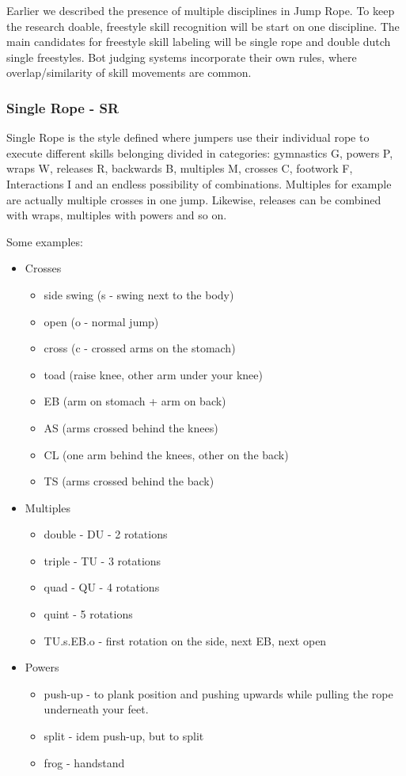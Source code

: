 Earlier we described the presence of multiple disciplines in Jump Rope. To keep the research doable, freestyle skill recognition will be start on one discipline. The main candidates for freestyle skill labeling will be single rope and double dutch single freestyles. Bot judging systems incorporate their own rules, where overlap/similarity of skill movements are common. 

\subsubsection{Single Rope - SR}

Single Rope is the style defined where jumpers use their individual rope to execute different skills belonging divided in categories: gymnastics G, powers P, wraps W, releases R, backwards B, multiples M, crosses C, footwork F, Interactions I and an endless possibility of combinations. Multiples for example are actually multiple crosses in one jump. Likewise, releases can be combined with wraps, multiples with powers and so on.

Some examples:

\begin{itemize}
    \item Crosses
    \begin{itemize}
        \item side swing (s - swing next to the body)
        \item open (o - normal jump)
        \item cross (c - crossed arms on the stomach)
        \item toad (raise knee, other arm under your knee)
        \item EB (arm on stomach + arm on back)
        \item AS (arms crossed behind the knees)
        \item CL (one arm behind the knees, other on the back)
        \item TS (arms crossed behind the back)
    \end{itemize}
    \item Multiples
    \begin{itemize}
        \item double - DU - 2 rotations
        \item triple - TU - 3 rotations
        \item quad - QU - 4 rotations
        \item quint - 5 rotations
        \item TU.s.EB.o - first rotation on the side, next EB, next open
    \end{itemize}
    \item Powers
    \begin{itemize}
        \item push-up - to plank position and pushing upwards while pulling the rope underneath your feet.
        \item split - idem push-up, but to split
        \item frog - handstand
    \end{itemize}
\end{itemize}

